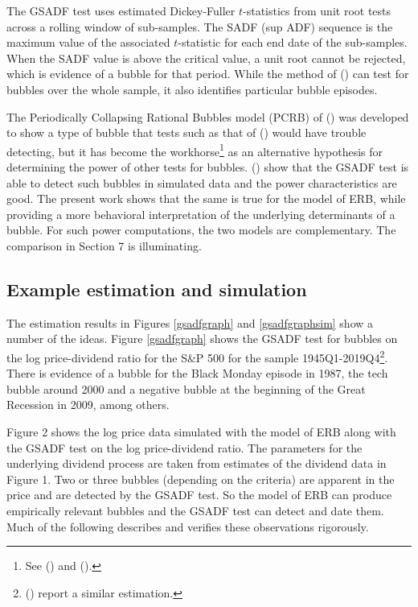 \documentclass[12pt]{article}
\begin{document}
The GSADF test uses estimated Dickey-Fuller $t$-statistics from unit root tests across a rolling window of sub-samples. The SADF (sup ADF) sequence is the maximum value of the associated $t$-statistic for each end date of the sub-samples. When the SADF value is above the critical value, a unit root cannot be rejected, which is evidence of a bubble for that period. While the method of \citeauthor{phillips2015testing} (\citeyear{phillips2015testing}) can test for bubbles over the whole sample, it also identifies particular bubble episodes.

The Periodically Collapsing Rational Bubbles model (PCRB) of \citeauthor{evans1991pitfalls} (\citeyear{evans1991pitfalls}) was developed to show a type of bubble that tests such as that of \citeauthor{DibaGrossman1988} (\citeyear{DibaGrossman1988}) would have trouble detecting, but it has become the workhorse\footnote{See \citeauthor{WATERS2008} (\citeyear{WATERS2008}) and \citeauthor{hommbreitung12bubtests} (\citeyear{hommbreitung12bubtests}).} as an alternative hypothesis for determining the power of other tests for bubbles. \citeauthor{phillips2015testing} (\citeyear{phillips2015testing}) show that the GSADF test is able to detect such bubbles in simulated data and the power characteristics are good. The present work shows that the same is true for the model of ERB, while providing a more behavioral interpretation of the underlying determinants of a bubble. For such power computations, the two models are complementary. The comparison in Section 7 is illuminating.

\subsection{Example estimation and simulation}

The estimation results in Figures \ref{gsadfgraph} and \ref{gsadfgraphsim} show a number of the ideas. Figure \ref{gsadfgraph} shows the GSADF test for bubbles on the log price-dividend ratio for the S\&P 500 for the sample 1945Q1-2019Q4\footnote{\citeauthor{NGUYEN2022} (\citeyear{NGUYEN2022}) report a similar estimation.}. There is evidence of a bubble for the Black Monday episode in 1987, the tech bubble around 2000 and a negative bubble at the beginning of the Great Recession in 2009, among others.

Figure 2 shows the log price data simulated with the model of ERB along with the GSADF test on the log price-dividend ratio. The parameters for the underlying dividend process are taken from estimates of the dividend data in Figure 1. Two or three bubbles (depending on the criteria) are apparent in the price and are detected by the GSADF test. So the model of ERB can produce empirically relevant bubbles and the GSADF test can detect and date them. Much of the following describes and verifies these observations rigorously.
\end{document}
